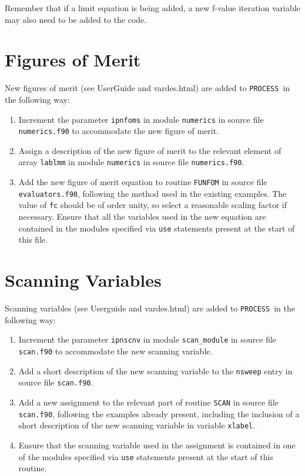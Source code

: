 \documentclass[11pt,a4paper]{report}
\newcommand{\process}{\mbox{\texttt{PROCESS}}}
\begin{document}
Remember that if a limit equation is being added, a new f-value iteration
variable may also need to be added to the code.

\section{Figures of Merit}

New figures of merit (see UserGuide and vardes.html) are added to \process\ in
the following way:

\begin{enumerate}

\item Increment the parameter \texttt{ipnfoms} in module \texttt{numerics} in
  source file \texttt{numerics.f90} to accommodate the new figure of merit.

\item Assign a description of the new figure of merit to the relevant element
  of array \texttt{lablmm} in module \texttt{numerics} in source file
  \texttt{numerics.f90}.

\item Add the new figure of merit equation to routine \texttt{FUNFOM} in
  source file \texttt{evaluators.f90}, following the method used in the
  existing examples. The value of \texttt{fc} should be of order unity, so
  select a reasonable scaling factor if necessary. Ensure that all the
  variables used in the new equation are contained in the modules specified
  via \texttt{use} statements present at the start of this file.


\end{enumerate}

\section{Scanning Variables}

Scanning variables (see Userguide and vardes.html) are added to \process\ in
the following way:

\begin{enumerate}

\item Increment the parameter \texttt{ipnscnv} in module \texttt{scan\_module}
  in source file \texttt{scan.f90} to accommodate the new scanning variable.

\item Add a short description of the new scanning variable to the
  \texttt{nsweep} entry in source file \texttt{scan.f90}.

\item Add a new assignment to the relevant part of routine \texttt{SCAN} in
  source file \texttt{scan.f90}, following the examples already present,
  including the inclusion of a short description of the new scanning variable
  in variable \texttt{xlabel}.

\item Ensure that the scanning variable used in the assignment is contained in
  one of the modules specified via \texttt{use} statements present at the
  start of this routine.

\end{enumerate}
\end{document}
